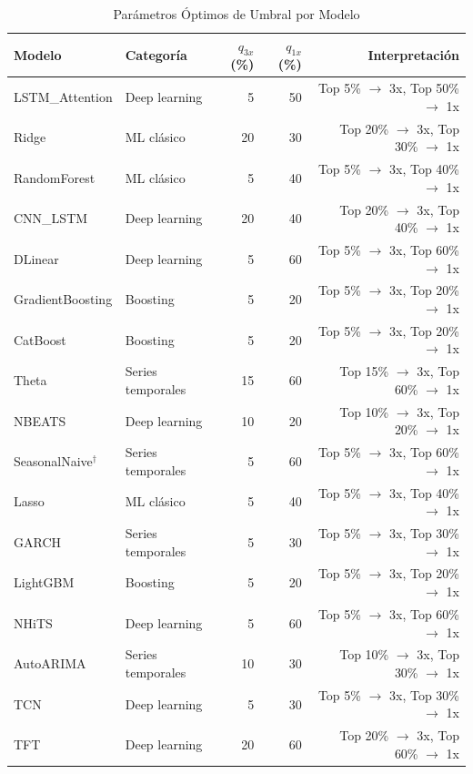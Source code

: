 \begin{table}[htbp]
\centering
\caption{Par\'ametros \'Optimos de Umbral por Modelo}
\label{tab:optimal_params}
\small
\begin{tabular}{@{}llrrr@{}}
\toprule
\textbf{Modelo} & \textbf{Categor\'ia} & \textbf{$q_{3x}$ (\%)} & \textbf{$q_{1x}$ (\%)} & \textbf{Interpretaci\'on} \\
\midrule
LSTM\_Attention & Deep learning & 5 & 50 & Top 5\% $\rightarrow$ 3x, Top 50\% $\rightarrow$ 1x \\
Ridge & ML cl\'asico & 20 & 30 & Top 20\% $\rightarrow$ 3x, Top 30\% $\rightarrow$ 1x \\
RandomForest & ML cl\'asico & 5 & 40 & Top 5\% $\rightarrow$ 3x, Top 40\% $\rightarrow$ 1x \\
CNN\_LSTM & Deep learning & 20 & 40 & Top 20\% $\rightarrow$ 3x, Top 40\% $\rightarrow$ 1x \\
DLinear & Deep learning & 5 & 60 & Top 5\% $\rightarrow$ 3x, Top 60\% $\rightarrow$ 1x \\
GradientBoosting & Boosting & 5 & 20 & Top 5\% $\rightarrow$ 3x, Top 20\% $\rightarrow$ 1x \\
CatBoost & Boosting & 5 & 20 & Top 5\% $\rightarrow$ 3x, Top 20\% $\rightarrow$ 1x \\
Theta & Series temporales & 15 & 60 & Top 15\% $\rightarrow$ 3x, Top 60\% $\rightarrow$ 1x \\
NBEATS & Deep learning & 10 & 20 & Top 10\% $\rightarrow$ 3x, Top 20\% $\rightarrow$ 1x \\
\rowcolor{naivebg} SeasonalNaive$^\dagger$ & Series temporales & 5 & 60 & Top 5\% $\rightarrow$ 3x, Top 60\% $\rightarrow$ 1x \\
Lasso & ML cl\'asico & 5 & 40 & Top 5\% $\rightarrow$ 3x, Top 40\% $\rightarrow$ 1x \\
GARCH & Series temporales & 5 & 30 & Top 5\% $\rightarrow$ 3x, Top 30\% $\rightarrow$ 1x \\
LightGBM & Boosting & 5 & 20 & Top 5\% $\rightarrow$ 3x, Top 20\% $\rightarrow$ 1x \\
NHiTS & Deep learning & 5 & 60 & Top 5\% $\rightarrow$ 3x, Top 60\% $\rightarrow$ 1x \\
AutoARIMA & Series temporales & 10 & 30 & Top 10\% $\rightarrow$ 3x, Top 30\% $\rightarrow$ 1x \\
TCN & Deep learning & 5 & 30 & Top 5\% $\rightarrow$ 3x, Top 30\% $\rightarrow$ 1x \\
TFT & Deep learning & 20 & 60 & Top 20\% $\rightarrow$ 3x, Top 60\% $\rightarrow$ 1x \\

\end{tabular}
\end{table}

